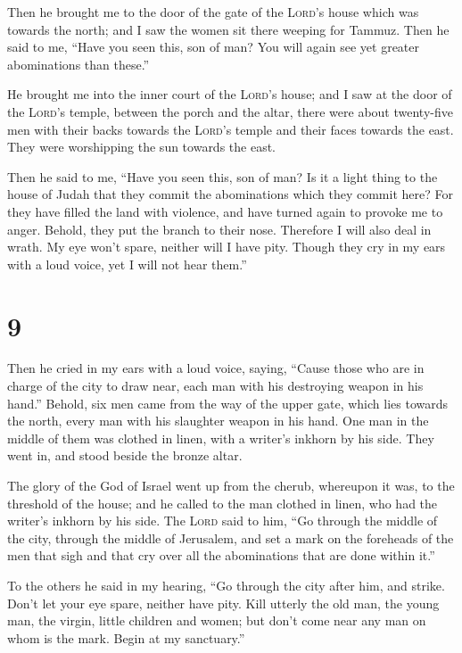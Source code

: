  Then he brought me to the door of the gate of the
\textsc{Lord}'s house which was towards the north; and I saw the women
sit there weeping for Tammuz.  Then he said to me, ``Have
you seen this, son of man? You will again see yet greater abominations
than these.''

 He brought me into the inner court of the
\textsc{Lord}'s house; and I saw at the door of the \textsc{Lord}'s
temple, between the porch and the altar, there were about twenty-five
men with their backs towards the \textsc{Lord}'s temple and their faces
towards the east. They were worshipping the sun towards the east.

 Then he said to me, ``Have you seen this, son of man? Is
it a light thing to the house of Judah that they commit the abominations
which they commit here? For they have filled the land with violence, and
have turned again to provoke me to anger. Behold, they put the branch to
their nose.  Therefore I will also deal in wrath. My eye
won't spare, neither will I have pity. Though they cry in my ears with a
loud voice, yet I will not hear them.''

\hypertarget{section-8}{%
\section{9}\label{section-8}}

 Then he cried in my ears with a loud voice, saying,
``Cause those who are in charge of the city to draw near, each man with
his destroying weapon in his hand.''  Behold, six men came
from the way of the upper gate, which lies towards the north, every man
with his slaughter weapon in his hand. One man in the middle of them was
clothed in linen, with a writer's inkhorn by his side. They went in, and
stood beside the bronze altar.

 The glory of the God of Israel went up from the cherub,
whereupon it was, to the threshold of the house; and he called to the
man clothed in linen, who had the writer's inkhorn by his side.
 The \textsc{Lord} said to him, ``Go through the middle of
the city, through the middle of Jerusalem, and set a mark on the
foreheads of the men that sigh and that cry over all the abominations
that are done within it.''

 To the others he said in my hearing, ``Go through the
city after him, and strike. Don't let your eye spare, neither have pity.
 Kill utterly the old man, the young man, the virgin,
little children and women; but don't come near any man on whom is the
mark. Begin at my sanctuary.''

